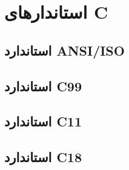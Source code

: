 \chapter{استاندارهای C}
\section{استاندارد ANSI/ISO}
\section{استاندارد C99}
\section{استاندارد C11}
\section{استاندارد C18}
